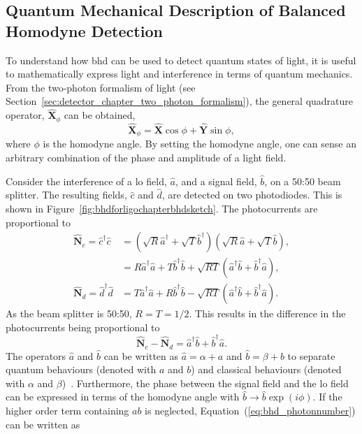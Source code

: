 \subsection{Quantum Mechanical Description of Balanced Homodyne Detection}
\label{sec:BHD_for_ligo_QM_BHD}
To understand how \gls{bhd} can be used to detect quantum states of light, it is useful to mathematically express light and interference in terms of quantum mechanics. From the two-photon formalism of light (see Section~\ref{sec:detector_chapter_two_photon_formalism}), the general quadrature operator, $\mathbf{\hat{X}}_\phi$ can be obtained,
\begin{equation}
\mathbf{\hat{X}}_\phi = \mathbf{\hat{X}}\cos\phi + \mathbf{\hat{Y}}\sin\phi,
\label{eq:BHD_for_ligo_general_quadrature}
\end{equation}
where $\phi$ is the homodyne angle. By setting the homodyne angle, one can sense an arbitrary combination of the phase and amplitude of a light field.
\par
Consider the interference of a \gls{lo} field, $\hat{a}$, and a signal field, $\hat{b}$, on a 50:50 beam splitter. The resulting fields,  $\hat{c}$ and $\hat{d}$, are detected on two photodiodes. This is shown in Figure~\ref{fig:bhdforligochapterbhdsketch}. The photocurrents are proportional to 
\begin{align}
\mathbf{\hat{N}}_c = \hat{c}^\dagger\hat{c} &= \left(\sqrt{R}\hat{a}^\dagger +\sqrt{T}\hat{b}^\dagger\right) \left(\sqrt{R}\hat{a} +\sqrt{T}\hat{b}\right), \nonumber \\
&= R\hat{a}^\dagger\hat{a} + T\hat{b}^\dagger\hat{b} + \sqrt{RT}(\hat{a}^\dagger\hat{b} + \hat{b}^\dagger\hat{a}),\\
\mathbf{\hat{N}}_d = \hat{d}^\dagger\hat{d} &= T\hat{a}^\dagger\hat{a} + R\hat{b}^\dagger\hat{b} - \sqrt{RT}(\hat{a}^\dagger\hat{b} + \hat{b}^\dagger\hat{a}).
\end{align}
As the beam splitter is 50:50, $R = T = 1/2$. This results in the difference in the photocurrents being proportional to
\begin{equation}
\mathbf{\hat{N}}_c - \mathbf{\hat{N}}_d = \hat{a}^\dagger\hat{b} + \hat{b}^\dagger\hat{a}.
\label{eq:bhd_photonnumber}
\end{equation}
The operators $\hat{a}$ and $\hat{b}$ can be written as $ \hat{a} = \alpha + a$ and $ \hat{b} = \beta + b$ to separate quantum behaviours (denoted  with $a$ and $b$) and classical behaviours (denoted  with $\alpha$ and $\beta$)~\cite{Steinlechner2015}. Furthermore, the phase between the signal field and the \gls{lo} field can be expressed in terms of the homodyne angle with $\hat{b}\rightarrow \hat{b}\exp(i\phi)$. If the higher order term containing $ a b$ is neglected, Equation~(\ref{eq:bhd_photonnumber}) can be written as
